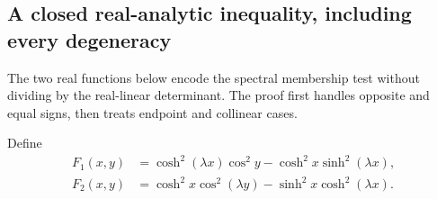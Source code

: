 \documentclass[11pt]{article}
\numberwithin{equation}{section}
\theoremstyle{definition}
\begin{document}
\subsection{A closed real-analytic inequality, including every degeneracy}

The two real functions below encode the spectral membership test
without dividing by the real-linear determinant. The proof first handles
opposite and equal signs, then treats endpoint and collinear cases.

Define
\begin{align}
 F_1(x,y)&=\cosh^2(\lambda x)\cos^2y
                -\cosh^2x\sinh^2(\lambda x),\label{eq:F1}\\
 F_2(x,y)&=\cosh^2x\cos^2(\lambda y)
                -\sinh^2x\cosh^2(\lambda x).\label{eq:F2}
\end{align}
\end{document}
